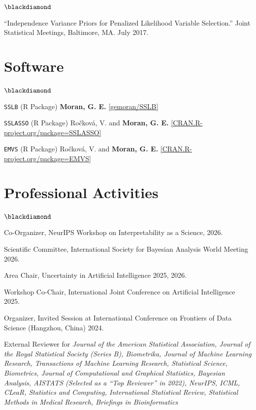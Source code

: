 \documentclass[margin,line]{res}
\newenvironment{list2}{
  \begin{list}{\footnotesize$\blackdiamond$}{%
      \setlength{\itemsep}{8pt}
      \setlength{\parsep}{2pt} \setlength{\parskip}{2pt}
      \setlength{\topsep}{2pt} \setlength{\partopsep}{2pt} 
      \setlength{\leftmargin}{0.2in}
      }}{\end{list}}
\begin{document}
\begin{resume}
\begin{list2}
\item ``Independence Variance Priors for Penalized Likelihood Variable Selection.'' Joint Statistical Meetings, Baltimore, MA. July 2017. 

\end{list2}

\section{\sc Software}
\begin{list2}
\item  \texttt{SSLB} (R Package) \textbf{Moran, G. E.} \href{https://github.com/gemoran/SSLB}{[gemoran/SSLB]}
\item \texttt{SSLASSO} (R Package) Ro\v{c}kov\'{a}, V. and \textbf{Moran, G. E.} \href{https://CRAN.R-project.org/package=SSLASSO}{[CRAN.R-project.org/package=SSLASSO]}
\item \texttt{EMVS} (R Package) Ro\v{c}kov\'{a}, V. and \textbf{Moran, G. E.} \href{https://CRAN.R-project.org/package=EMVS}{[CRAN.R-project.org/package=EMVS]}
\end{list2}


\section{\sc Professional Activities}
\begin{list2}
\item Co-Organizer, NeurIPS Workshop on Interpretability as a Science, 2026.
\item Scientific Committee, International Society for Bayesian Analysis World Meeting 2026.
\item Area Chair, Uncertainty in Artificial Intelligence 2025, 2026. 
\item Workshop Co-Chair, International Joint Conference on Artificial Intelligence 2025.
\item Organizer, Invited Session at International Conference on Frontiers of Data Science (Hangzhou, China) 2024.
\item External Reviewer for \emph{Journal of the American Statistical Association, Journal of the Royal Statistical Society (Series B), Biometrika, Journal of Machine Learning Research, Transactions of Machine Learning Research, Statistical Science, Biometrics, Journal of Computational and Graphical Statistics, Bayesian Analysis, AISTATS (Selected as a ``Top Reviewer'' in 2022), NeurIPS, ICML, CLeaR, Statistics and Computing, International Statistical Review, Statistical Methods in Medical Research, Briefings in Bioinformatics}
\end{list2}


\end{resume}
\end{document}
